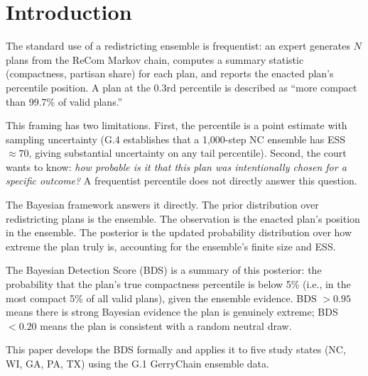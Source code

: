\section{Introduction}

The standard use of a redistricting ensemble is frequentist: an expert generates
$N$ plans from the ReCom Markov chain, computes a summary statistic (compactness,
partisan share) for each plan, and reports the enacted plan's percentile position.
A plan at the 0.3rd percentile is described as ``more compact than 99.7\% of valid plans.''

This framing has two limitations.
First, the percentile is a point estimate with sampling uncertainty (G.4 establishes
that a 1,000-step NC ensemble has ESS $\approx 70$, giving substantial uncertainty
on any tail percentile).
Second, the court wants to know: \emph{how probable is it that this plan was
intentionally chosen for a specific outcome?}
A frequentist percentile does not directly answer this question.

The Bayesian framework answers it directly.
The prior distribution over redistricting plans is the ensemble.
The observation is the enacted plan's position in the ensemble.
The posterior is the updated probability distribution over how extreme the plan
truly is, accounting for the ensemble's finite size and ESS.

The Bayesian Detection Score (BDS) is a summary of this posterior: the probability
that the plan's true compactness percentile is below 5\% (i.e., in the most
compact 5\% of all valid plans), given the ensemble evidence.
BDS $> 0.95$ means there is strong Bayesian evidence the plan is genuinely extreme;
BDS $< 0.20$ means the plan is consistent with a random neutral draw.

This paper develops the BDS formally and applies it to five study states
(NC, WI, GA, PA, TX) using the G.1 GerryChain ensemble data.

